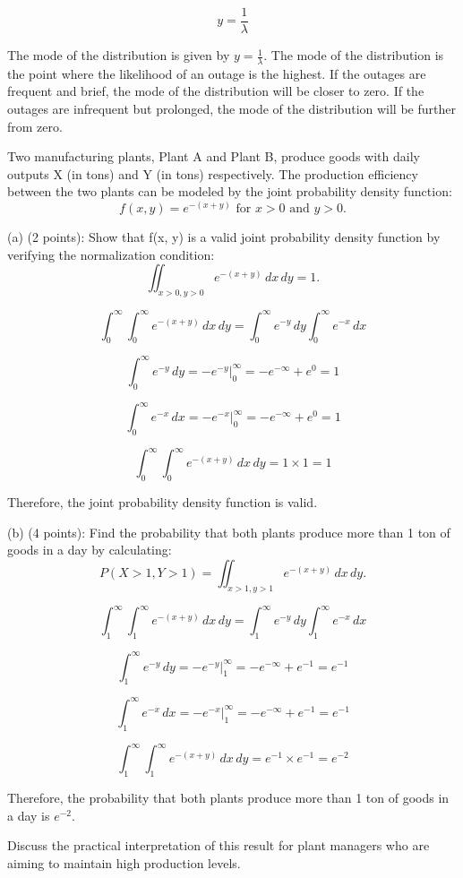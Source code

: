 \documentclass{article}
\begin{document}
\[y = \frac{1}{\lambda}\]

The mode of the distribution is given by \(y = \frac{1}{\lambda}\). The mode of the distribution is the point where the likelihood of an outage is the highest. If the outages are frequent and brief, the mode of the distribution will be closer to zero. If the outages are infrequent but prolonged, the mode of the distribution will be further from zero.

Two manufacturing plants, Plant A and Plant B, produce goods with daily outputs X (in tons) and Y (in tons) respectively. The production efficiency between the two plants can be modeled by the joint probability density function:
\[f(x, y) = e^{-(x+y)} \text{ for } x > 0 \text{ and } y > 0.\]

(a) (2 points): Show that f(x, y) is a valid joint probability density function by verifying the
normalization condition:
\[\iint_{x > 0, y > 0} e^{-(x+y)} \, dx \, dy = 1.\]

\[\int_{0}^{\infty}\int_{0}^{\infty}e^{-(x+y)} \, dx \, dy = \int_{0}^{\infty}e^{-y} \, dy \int_{0}^{\infty}e^{-x} \, dx\]

\[\int_{0}^{\infty}e^{-y} \, dy = -e^{-y}\Big|_{0}^{\infty} = -e^{-\infty} + e^{0} = 1\]

\[\int_{0}^{\infty}e^{-x} \, dx = -e^{-x}\Big|_{0}^{\infty} = -e^{-\infty} + e^{0} = 1\]

\[\int_{0}^{\infty}\int_{0}^{\infty}e^{-(x+y)} \, dx \, dy = 1 \times 1 = 1\]

Therefore, the joint probability density function is valid.

(b) (4 points): Find the probability that both plants produce more than 1 ton of goods in a day
by calculating:
\[
P(X > 1, Y > 1) =
\iint_{x > 1, y > 1} e^{-(x+y)} \, dx \, dy.
\]

\[\int_{1}^{\infty}\int_{1}^{\infty}e^{-(x+y)} \, dx \, dy = \int_{1}^{\infty}e^{-y} \, dy \int_{1}^{\infty}e^{-x} \, dx\]

\[\int_{1}^{\infty}e^{-y} \, dy = -e^{-y}\Big|_{1}^{\infty} = -e^{-\infty} + e^{-1} = e^{-1}\]

\[\int_{1}^{\infty}e^{-x} \, dx = -e^{-x}\Big|_{1}^{\infty} = -e^{-\infty} + e^{-1} = e^{-1}\]

\[\int_{1}^{\infty}\int_{1}^{\infty}e^{-(x+y)} \, dx \, dy = e^{-1} \times e^{-1} = e^{-2}\]

Therefore, the probability that both plants produce more than 1 ton of goods in a day is \(e^{-2}\).

Discuss the practical interpretation of this result for plant managers who are aiming to maintain
high production levels.
\end{document}
